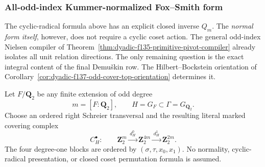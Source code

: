 \documentclass[11pt]{article}
\theoremstyle{definition}
\begin{document}
\subsubsection{All-odd-index Kummer-normalized Fox--Smith form}
\label{subsubsec:dyadic-f138-all-odd-index-kummer-normal}

The cyclic-radical formula above has an explicit closed
inverse $Q_m$.  The \emph{normal form itself}, however,
does not require a cyclic coset action.  The general
odd-index Nielsen compiler of
Theorem~\ref{thm:dyadic-f135-primitive-pivot-compiler}
already isolates all unit relation directions.
The only remaining question is the exact integral
content of the final Demu\v{s}kin row.  The
Hilbert--Bockstein orientation of
Corollary~\ref{cor:dyadic-f137-odd-cover-top-orientation}
determines it.

Let $F/\mathbf Q_2$ be any finite extension of odd
degree
\[
m=[F:\mathbf Q_2],
\qquad H=G_F\subset\Gamma=G_{\mathbf Q_2}.
\]
Choose an ordered right Schreier transversal and the
resulting literal marked covering complex
\begin{equation}\label{eq:dyadic-f138-general-cover}
C_H^\bullet:
\qquad
\mathbf Z_2^m
\xrightarrow{\,d_H^0\,}
\mathbf Z_2^{4m}
\xrightarrow{\,d_H^1\,}
\mathbf Z_2^{2m}.
\end{equation}
The four degree-one blocks are ordered by
$(\sigma,\tau,x_0,x_1)$.
No normality, cyclic-radical presentation, or
closed coset permutation formula is assumed.
\end{document}
